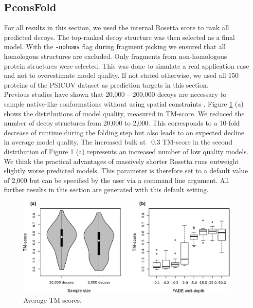 \documentclass{bioinfo}
\begin{document}
\subsection{PconsFold}
For all results in this section, we used the internal Rosetta score to rank all predicted decoys. The top-ranked decoy structure was then selected as a final model. With the {\tt -nohoms} flag during fragment picking we ensured that all homologous structures are excluded. Only fragments from non-homologous protein structures were selected. This was done to simulate a real application case and not to overestimate model quality. If not stated otherwise, we used all 150 proteins of the PSICOV dataset as prediction targets in this section. \\\indent
Previous studies have shown that 20,000 -- 200,000 decoys are necessary to sample native-like conformations without using spatial constraints \cite[]{rosetta@home, rosetta_folding}. Figure \ref{fig:ros} (a) shows the distributions of model quality, measured in TM-score. We reduced the number of decoy structures from 20,000 to 2,000. This corresponds to a 10-fold decrease of runtime during the folding step but also leads to an expected decline in average model quality.  The increased bulk at ~0.3 TM-score in the second distribution of Figure \ref{fig:ros} (a) represents an increased number of low quality models. We think the practical advantages of massively shorter Rosetta runs outweight slightly worse predicted models. This parameter is therefore set to a default value of 2,000 but can be specified by the user via a command line argument. All further results in this section are generated with this default setting. \\\indent
\begin{figure}[!tpb]%
    \centerline{\includegraphics[scale=0.35]{figures/rosetta.eps}}
\caption{Average TM-scores.}\label{fig:ros}
\end{figure}
\end{document}
